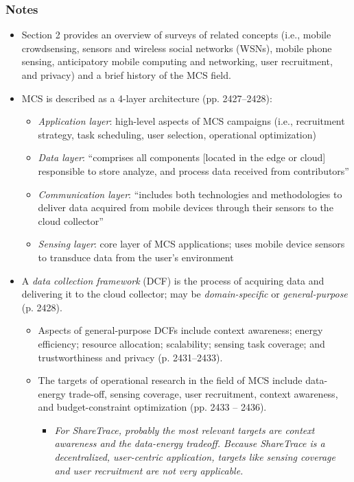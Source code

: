\subsubsection*{Notes}
	\begin{itemize}
	\item Section 2 provides an overview of surveys of related concepts (i.e., mobile crowdsensing, sensors and wireless social networks (WSNs), mobile phone sensing, anticipatory mobile computing and networking, user recruitment, and privacy) and a brief history of the MCS field.
	\item MCS is described as a 4-layer architecture (pp. 2427--2428):
		\begin{itemize}
		\item \emph{Application layer}: high-level aspects of MCS campaigns (i.e., recruitment strategy, task scheduling, user selection, operational optimization)
		\item \emph{Data layer}: ``comprises all components [located in the edge or cloud] responsible to store analyze, and process data received from contributors''
		\item \emph{Communication layer}: ``includes both technologies and methodologies to deliver data acquired from mobile devices through their sensors to the cloud collector''
		\item \emph{Sensing layer}: core layer of MCS applications; uses mobile device sensors to transduce data from the user's environment
		\end{itemize}
	\item A \emph{data collection framework} (DCF) is the process of acquiring data and delivering it to the cloud collector; may be \emph{domain-specific} or \emph{general-purpose} (p. 2428).
		\begin{itemize}
		\item Aspects of general-purpose DCFs include context awareness; energy efficiency; resource allocation; scalability; sensing task coverage; and trustworthiness and privacy (p. 2431--2433).
		\item The targets of operational research in the field of MCS include data-energy trade-off, sensing coverage, user recruitment, context awareness, and budget-constraint optimization (pp. 2433 -- 2436).
			\begin{itemize}
			\item \emph{For ShareTrace, probably the most relevant targets are context awareness and the data-energy tradeoff. Because ShareTrace is a decentralized, user-centric application, targets like sensing coverage and user recruitment are not very applicable.}

\end{itemize}
\end{itemize}
\end{itemize}
